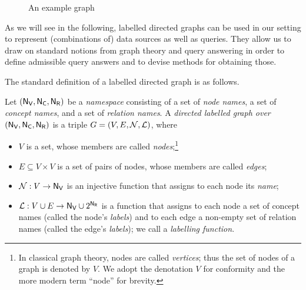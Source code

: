 \begin{figure}
  \caption{An example graph}
  \label{fig:example_graph}
\end{figure}

As we will see in the following, labelled directed graphs can be used in our setting
to represent (combinations of) data sources as well as queries.
They allow us to draw on standard notions from graph theory and query answering
in order to define admissible query answers and to devise methods for obtaining those.

The standard definition of a labelled directed graph is as follows.

%
\begin{definition}
  \label{def:ld_graph}
  Let $(\mathsf{N}_\mathsf{V},\mathsf{N}_\mathsf{C},\mathsf{N}_\mathsf{R})$ be a \emph{namespace} consisting of a set \NV of \emph{node names}, a set \NC of \emph{concept names}, and a set \NR of \emph{relation names}.
  A \emph{directed labelled graph over $(\mathsf{N}_\mathsf{V},\mathsf{N}_\mathsf{C},\mathsf{N}_\mathsf{R})$} is a triple $G = (V,E,\mathcal{N},\mathcal{L})$,
  where
  \begin{itemize}
    \item
      $V$ is a set, whose members are called \emph{nodes};\footnote{%
        In classical graph theory, nodes are called \emph{vertices}; thus the set of
        nodes of a graph is denoted by $V$. We adopt the denotation $V$ for conformity
        and the more modern term ``node'' for brevity.%
      }      
    \item 
      $E \subseteq V \times V$ is a set of pairs of nodes, whose members are called \emph{edges};
    \item
      $\mathcal{N} : V \to \mathsf{N}_\mathsf{V}$ is an injective function that assigns
      to each node its \emph{name};
    \item
      $\mathcal{L} : V \cup E \to \mathsf{N}_\mathsf{V} \cup 2^{\mathsf{N}_\mathsf{R}}$ is a function that assigns 
      to each node a set of concept names (called the node's \emph{labels}) and
      to each edge a non-empty set of relation names (called the edge's \emph{labels});
      we call \Lmc a \emph{labelling function}.
  \end{itemize}
\end{definition}
